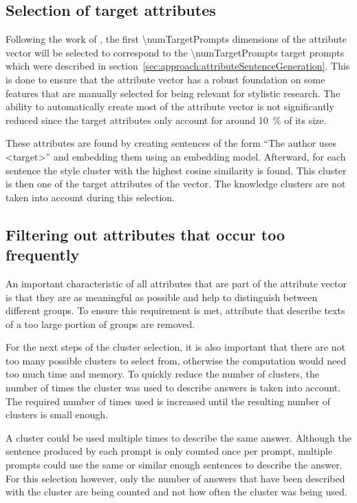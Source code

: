 \subsection{Selection of target attributes}
\label{sec:approach:selection:targetAttributes}
Following the work of \citet{patelLearningInterpretableStyle2023}, the first \num{\numTargetPrompts} dimensions of the attribute vector will be selected to correspond to the \num{\numTargetPrompts} target prompts which were described in section~\ref{sec:approach:attributeSentenceGeneration}.
This is done to ensure that the attribute vector has a robust foundation on some features that are manually selected for being relevant for stylistic research. The ability to automatically create most of the attribute vector is not significantly reduced since the target attributes only account for around \SI{10}{\percent} of its size. %

These attributes are found by creating sentences of the form \enquote{The author uses <target>} and embedding them using an embedding model.
Afterward, for each sentence the style cluster with the highest cosine similarity is found. This cluster is then one of the target attributes of the vector. The knowledge clusters are not taken into account during this selection.


\subsection{Filtering out attributes that occur too frequently}
\label{sec:approach:selection:filteringOccurance}
An important characteristic of all attributes that are part of the attribute vector is that they are as meaningful as possible and help to distinguish between different groups. To ensure this requirement is met, attribute that describe texts of a too large portion of groups are removed.

For the next steps of the cluster selection, it is also important that there are not too many possible clusters to select from, otherwise the computation would need too much time and memory. To quickly reduce the number of clusters, the number of times the cluster was used to describe answers is taken into account. The required number of times used is increased until the resulting number of clusters is small enough.

A cluster could be used multiple times to describe the same answer. Although the sentence produced by each prompt is only counted once per prompt, multiple prompts could use the same or similar enough sentences to describe the answer. For this selection however, only the number of answers that have been described with the cluster are being counted and not how often the cluster was being used.

